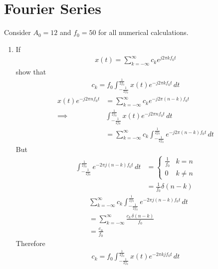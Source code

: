 \documentclass[journal,12pt,twocolumn]{IEEEtran}
\renewcommand\thesection{\arabic{section}}
\begin{document}
\section{Fourier Series}
Consider $A_0 =12$ and $f_0 = 50$ for all numerical calculations.
\begin{enumerate}[label=\thesection.\arabic*,ref=\thesection.\theenumi]
\item If
\begin{align}
	x(t) = \sum_{k = -\infty}^{\infty}c_ke^{j 2 \pi kf_0 t}
\label{eq:one-Z-complex}
\end{align}
show that 
\begin{align}
	c_k = f_0\int_{-\frac{1}{2f_0}}^{\frac{1}{2f_0}}x(t)e^{-j 2 \pi kf_0 t}\, dt
\label{eq:one-Z}
\end{align}
\solution
\begin{align}
	x(t)e^{-j 2 \pi nf_0t} &= \sum_{k = -\infty}^{\infty}c_ke^{-j 2 \pi (n - k)f_0 t} \\
	\implies &\int_{-\frac{1}{2f_0}}^{\frac{1}{2f_0}} x(t)e^{-j 2 \pi nf_0t} \, {dt} \\ &= \sum_{k = -\infty}^{\infty} c_k \int_{-\frac{1}{2f_0}}^{\frac{1}{2f_0}} e^{-j 2 \pi (n - k)f_0 t} \, {dt} 
\end{align}
But 
\begin{align}
	\int_{-\frac{1}{2f_0}}^{\frac{1}{2f_0}} e^{-2 \pi j (n - k)f_0 t} \,{dt} &=
	\begin{cases}
		\frac{1}{f_0} & k = n \\
		0 & k \ne n	
	\end{cases}	\\
	&= \frac{1}{f_0} \delta(n-k)
\end{align}
\begin{align}
	&\sum_{k = -\infty}^{\infty} c_k \int_{-\frac{1}{2f_0}}^{\frac{1}{2f_0}} e^{-2 \pi j (n - k)f_0 t} \, {dt} \\ &= \sum_{k = -\infty}^{\infty} \frac{c_k \, \delta(n-k)}{f_0} \\
		&= \frac{c_n}{f_0} 
\end{align}
Therefore
\begin{align}
	c_k = f_0\int_{-\frac{1}{2f_0}}^{\frac{1}{2f_0}}x(t)e^{- 2 \pi k j f_0 t}\, {dt}
\end{align}



\end{enumerate}
\end{document}
